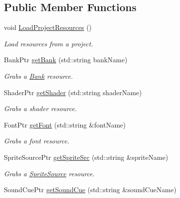 \subsection*{Public Member Functions}
\begin{DoxyCompactItemize}
\item 
\hypertarget{classDCEngine_1_1Systems_1_1Content_a06ab0b01a39b528d99e94146c69bc62a}{void \hyperlink{classDCEngine_1_1Systems_1_1Content_a06ab0b01a39b528d99e94146c69bc62a}{Load\-Project\-Resources} ()}\label{classDCEngine_1_1Systems_1_1Content_a06ab0b01a39b528d99e94146c69bc62a}

\begin{DoxyCompactList}\small\item\em Load resources from a project. \end{DoxyCompactList}\item 
Bank\-Ptr \hyperlink{classDCEngine_1_1Systems_1_1Content_a9e7a6f2318997afd91906175307df4c6}{get\-Bank} (std\-::string bank\-Name)
\begin{DoxyCompactList}\small\item\em Grabs a \hyperlink{classDCEngine_1_1Bank}{Bank} resource. \end{DoxyCompactList}\item 
Shader\-Ptr \hyperlink{classDCEngine_1_1Systems_1_1Content_adc5229d03f74e7b3134f35e22341368e}{get\-Shader} (std\-::string shader\-Name)
\begin{DoxyCompactList}\small\item\em Grabs a shader resource. \end{DoxyCompactList}\item 
Font\-Ptr \hyperlink{classDCEngine_1_1Systems_1_1Content_a4103e542bf0efb910429a69b274a8634}{get\-Font} (std\-::string \&font\-Name)
\begin{DoxyCompactList}\small\item\em Grabs a font resource. \end{DoxyCompactList}\item 
Sprite\-Source\-Ptr \hyperlink{classDCEngine_1_1Systems_1_1Content_a01e53fe6a380629bc1200c01452c583a}{get\-Sprite\-Src} (std\-::string \&sprite\-Name)
\begin{DoxyCompactList}\small\item\em Grabs a \hyperlink{classDCEngine_1_1SpriteSource}{Sprite\-Source} resource. \end{DoxyCompactList}\item 
Sound\-Cue\-Ptr \hyperlink{classDCEngine_1_1Systems_1_1Content_ae0eb7e36feb5c793a0acefb204315c43}{get\-Sound\-Cue} (std\-::string \&sound\-Cue\-Name)

\end{DoxyCompactItemize}
